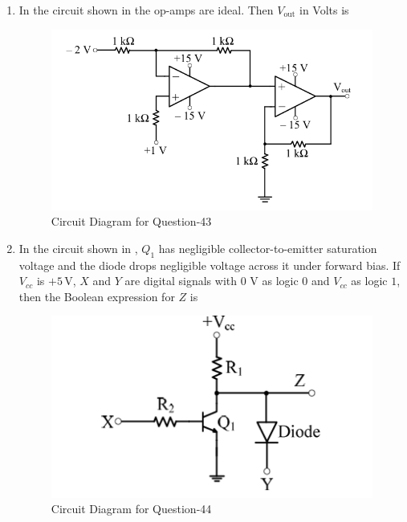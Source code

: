 \documentclass[journal,12pt,onecolumn]{IEEEtran}
\theoremstyle{remark}
\begin{document}
\begin{enumerate}
\item In the circuit shown in  the op-amps are ideal. Then $V_{\text{out}}$ in Volts is  
\par \hfill{}
\begin{figure}[H]
\centering
\includegraphics[width=0.6\columnwidth]{Figs/Q-43.png}
\caption{Circuit Diagram for Question-43}
\label{43}
\end{figure}
\begin{enumerate}
\end{enumerate}

\item In the circuit shown in , $Q_1$ has negligible collector-to-emitter saturation voltage and the diode drops negligible voltage across it under forward bias. If $V_{cc}$ is $+5\,\text{V}$, $X$ and $Y$ are digital signals with $0$ V as logic $0$ and $V_{cc}$ as logic $1$, then the Boolean expression for $Z$ is  \par \hfill{}
\begin{figure}[H]
    \centering
    \includegraphics[width=0.5\linewidth]{Figs/Q-44.png}
    \caption{Circuit Diagram for Question-44}
    \label{44}
\end{figure}
\begin{enumerate}
\end{enumerate}


\end{enumerate}
\end{document}
